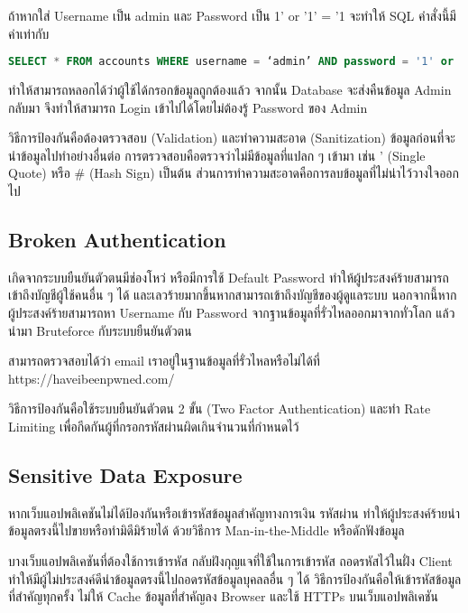 ถ้าหากใส่ Username เป็น admin และ Password เป็น 1' or '1' = '1 จะทำให้ SQL คำสั่งนี้มีค่าเท่ากับ

\begin{lstlisting}[language=SQL, numbers=none] 
SELECT * FROM accounts WHERE username = ‘admin’ AND password = '1' or '1' = '1'
\end{lstlisting}

ทำให้สามารถหลอกได้ว่าผู้ใช้ได้กรอกข้อมูลถูกต้องแล้ว จากนั้น Database จะส่งคืนข้อมูล Admin กลับมา จึงทำให้สามารถ Login เข้าไปได้โดยไม่ต้องรู้ Password ของ Admin

วิธีการป้องกันคือต้องตรวจสอบ (Validation) และทำความสะอาด (Sanitization) ข้อมูลก่อนที่จะนำข้อมูลไปทำอย่างอื่นต่อ การตรวจสอบคือตรวจว่าไม่มีข้อมูลที่แปลก ๆ เข้ามา เช่น ' (Single Quote) หรือ \# (Hash Sign) เป็นต้น ส่วนการทำความสะอาดคือการลบข้อมูลที่ไม่น่าไว้วางใจออกไป

\subsection{Broken Authentication}
เกิดจากระบบยืนยันตัวตนมีช่องโหว่ หรือมีการใช้ Default Password ทำให้ผู้ประสงค์ร้ายสามารถเข้าถึงบัญชีผู้ใช้คนอื่น ๆ ได้ และเลวร้ายมากขึ้นหากสามารถเข้าถึงบัญชีของผู้ดูแลระบบ นอกจากนี้หากผู้ประสงค์ร้ายสามารถหา Username กับ Password จากฐานข้อมูลที่รั่วไหลออกมาจากทั่วโลก \cite{???} แล้วนำมา Bruteforce กับระบบยืนยันตัวตน

สามารถตรวจสอบได้ว่า email เราอยู่ในฐานข้อมูลที่รั่วไหลหรือไม่ได้ที่ https://haveibeenpwned.com/

วิธีการป้องกันคือใช้ระบบยืนยันตัวตน 2 ขั้น (Two Factor Authentication) \cite{???} และทำ Rate Limiting เพื่อกีดกันผู้ที่กรอกรหัสผ่านผิดเกินจำนวนที่กำหนดไว้

\subsection{Sensitive Data Exposure}
หากเว็บแอปพลิเคชันไม่ได้ป้องกันหรือเข้ารหัสข้อมูลสำคัญทางการเงิน รหัสผ่าน ทำให้ผู้ประสงค์ร้ายนำข้อมูลตรงนี้ไปขายหรือทำมิดีมิร้ายได้ ด้วยวิธีการ Man-in-the-Middle \cite{???} หรือดักฟังข้อมูล

บางเว็บแอปพลิเคชันที่ต้องใช้การเข้ารหัส กลับฝังกุญแจที่ใช้ในการเข้ารหัส ถอดรหัสไว้ในฝั่ง Client ทำให้มีผู้ไม่ประสงค์ดีนำข้อมูลตรงนี้ไปถอดรหัสข้อมูลบุคลลอื่น ๆ ได้
วิธีการป้องกันคือให้เข้ารหัสข้อมูลที่สำคัญทุกครั้ง ไม่ให้ Cache ข้อมูลที่สำคัญลง Browser และใช้ HTTPs บนเว็บแอปพลิเคชัน

